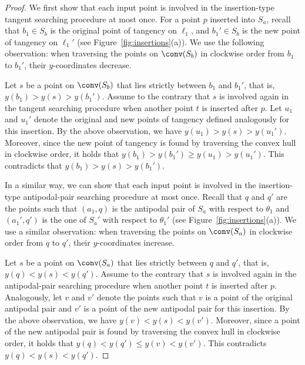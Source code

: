 \begin{proof}
    We first show that each input point is involved in the insertion-type tangent searching procedure at most once.
    For a point $p$ inserted into $S_a$, recall that $b_1 \in S_b$ is the original point of tangency on $\ell_1$, and $b_1' \in S_b$ is the new point of tangency on $\ell_1'$ (see Figure~\ref{fig:insertions}(a)).
    We use the following observation:
    when traversing the points on $\conv(S_b)$ in clockwise order from $b_1$ to $b_1'$, their $y$-coordinates decrease.
    
    Let $s$ be a point on $\conv(S_b)$ that lies strictly between $b_1$ and $b_1'$, that is, $y(b_1) > y(s) > y(b_1')$.
    Assume to the contrary that $s$ is involved again in the tangent searching procedure when another point $t$ is inserted after $p$.
    Let $u_1$ and $u_1'$ denote the original and new points of tangency defined analogously for this insertion.
    By the above observation, we have $y(u_1) > y(s) > y(u_1')$.
    Moreover, since the new point of tangency is found by traversing the convex hull in clockwise order, 
    it holds that $y(b_1) > y(b_1') \ge y(u_1) > y(u_1')$.
    This contradicts that $y(b_1) > y(s) > y(b_1')$.

    In a similar way, we can show that each input point is involved in the insertion-type antipodal-pair searching procedure at most once.
    Recall that $q$ and $q'$ are the points such that $(a_1, q)$ is the antipodal pair of $S_a$ with respect to $\theta_1$ and $(a_1',q')$ is the one of $S_a'$ with respect to $\theta_1'$ (see Figure~\ref{fig:insertions}(a)). 
    We use a similar observation: when traversing the points on $\conv(S_a)$ in clockwise order from $q$ to $q'$, their $y$-coordinates increase.
    
    Let $s$ be a point on $\conv(S_a)$ that lies strictly between $q$ and $q'$, that is, $y(q) < y(s) < y(q')$.
    Assume to the contrary that $s$ is involved again in the antipodal-pair searching procedure when another point $t$ is inserted after $p$.
    Analogously, let $v$ and $v'$ denote the points such that $v$ is a point of the original antipodal pair and $v'$ is a point of the new antipodal pair for this insertion.
    By the above observation, we have $y(v) < y(s) < y(v')$.
    Moreover, since a point of the new antipodal pair is found by traversing the convex hull in clockwise order, 
    it holds that $y(q) < y(q') \le y(v) < y(v')$.
    This contradicts $y(q) < y(s) < y(q')$.
\end{proof}




